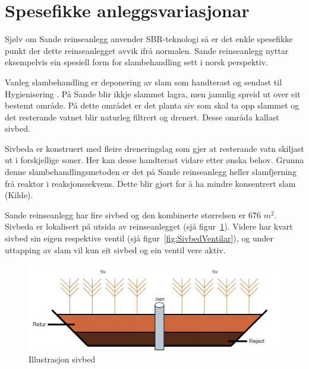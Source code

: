 \newpage
\section{Spesefikke anleggsvariasjonar}
\thispagestyle{fancy}

Sjølv om Sande reinseanlegg anvender \gls{SBR}-teknologi så er det enkle spesefikke
punkt der dette reinseanlegget avvik ifrå normalen. 
Sande reinseanlegg nyttar eksempelvis ein spesiell form for slambehandling sett i norsk perspektiv.

Vanleg slambehandling er deponering av slam som handterast og sendast til \gls{Hygienisering} \citep{Slam}.
På Sande blir ikkje slammet lagra, men jamnlig spreid ut over eit bestemt område. På dette området er
det planta siv som skal ta opp slammet og det resterande vatnet blir naturleg filtrert og drenert.
Desse områda kallast sivbed.

Sivbeda er konstruert med fleire dreneringslag som gjer at resterande vatn skiljast ut i forskjellige soner.
Her kan desse handterast vidare etter ønska behov. 
Grunna denne slambehandlingsmetoden er det på Sande reinseanlegg heller slamfjerning frå reaktor
i reaksjonssekvens. Dette blir gjort for å ha mindre konsentrert slam (Kilde). %

Sande reinseanlegg har fire sivbed og den kombinerte størrelsen er 676 $m^2$. Sivbeda er lokalisert på utsida av reinseanlegget (sjå figur~\ref{fig:Sivbed}).\newline
Videre har kvart sivbed sin eigen respektive ventil (sjå figur~\ref{fig:SivbedVentilar}), og under uttapping av slam vil kun eit sivbed og ein ventil vere aktiv. 
 

\begin{figure}[htbp]
    \centering
    \includegraphics[width=1\textwidth]{Figurar/Sivbed.png}
    \caption{Illustrasjon sivbed}\label{fig:Sivbed}
\end{figure}

\newpage

